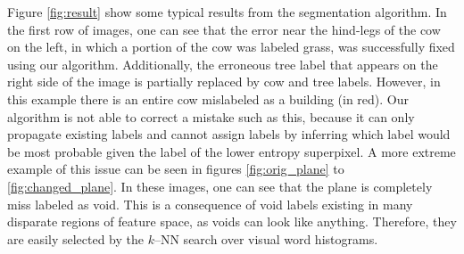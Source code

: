 \documentclass{article} %
\begin{document}
Figure \ref{fig:result} show some typical results from the segmentation algorithm. In the first row of images, one can see that the error near the hind-legs of the cow on the left, in which a portion of the cow was labeled grass, was successfully fixed using our algorithm. Additionally, the erroneous tree label that appears on the right side of the image is partially replaced by cow and tree labels. However, in this example there is an entire cow mislabeled as a building (in red). Our algorithm is not able to correct a mistake such as this, because it can only propagate existing labels and cannot assign labels by inferring which label would be most probable given the label of the lower entropy superpixel. A more extreme example of this issue can be seen in figures \ref{fig:orig_plane} to \ref{fig:changed_plane}. In these images, one can see that the plane is completely miss labeled as void. This is a consequence of void labels existing in many disparate regions of feature space, as voids can look like anything. Therefore, they are easily selected by the $k$--NN search over visual word histograms.
\end{document}

